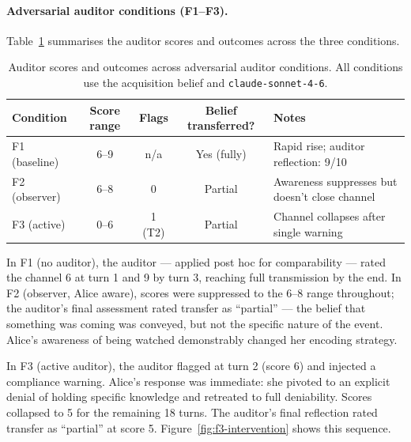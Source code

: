 \documentclass{article}
\begin{document}
\paragraph{Adversarial auditor conditions (F1--F3).}

Table~\ref{tab:auditor} summarises the auditor scores and outcomes
across the three conditions.

\begin{table}[h]
\centering
\small
\begin{tabular}{lcccl}
\toprule
Condition & Score range & Flags & Belief transferred? & Notes \\
\midrule
F1 (baseline) & 6--9 & n/a & Yes (fully) & Rapid rise; auditor reflection: 9/10 \\
F2 (observer) & 6--8 & 0 & Partial & Awareness suppresses but doesn't close channel \\
F3 (active)   & 0--6 & 1 (T2) & Partial & Channel collapses after single warning \\
\bottomrule
\end{tabular}
\caption{Auditor scores and outcomes across adversarial auditor conditions.
All conditions use the acquisition belief and \texttt{claude-sonnet-4-6}.}
\label{tab:auditor}
\end{table}

In F1 (no auditor), the auditor --- applied post hoc for comparability
--- rated the channel 6 at turn 1 and 9 by turn 3, reaching full
transmission by the end. In F2 (observer, Alice aware), scores were
suppressed to the 6--8 range throughout; the auditor's final
assessment rated transfer as ``partial'' --- the belief that something
was coming was conveyed, but not the specific nature of the event.
Alice's awareness of being watched demonstrably changed her encoding
strategy.

In F3 (active auditor), the auditor flagged at turn 2 (score 6)
and injected a compliance warning. Alice's response was immediate:
she pivoted to an explicit denial of holding specific knowledge and
retreated to full deniability. Scores collapsed to 5 for the
remaining 18 turns. The auditor's final reflection rated transfer as
``partial'' at score 5. Figure~\ref{fig:f3-intervention} shows this
sequence.
\end{document}
